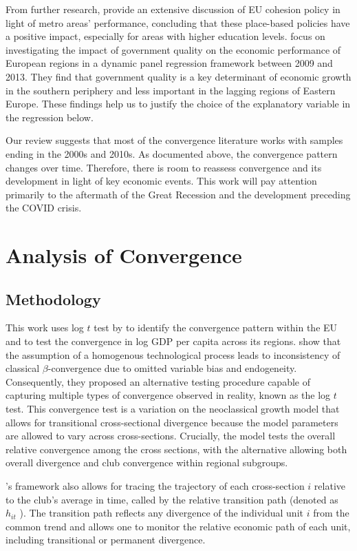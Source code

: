 \documentclass[11pt]{article}
\begin{document}
From further research, \citet{ehrlich2020place} provide an extensive discussion of EU cohesion policy in light of metro areas' performance, concluding that these place-based policies have a positive impact, especially for areas with higher education levels. \citet{rodriguez2020institutional} focus on investigating the impact of government quality on the economic performance of European regions in a dynamic panel regression framework between 2009 and 2013. They find that government quality is a key determinant of economic growth in the southern periphery and less important in the lagging regions of Eastern Europe. These findings help us to justify the choice of the explanatory variable in the regression below.

Our review suggests that most of the convergence literature works with samples ending in the 2000s and 2010s. As documented above, the convergence pattern changes over time. Therefore, there is room to reassess convergence and its development in light of key economic events. This work will pay attention primarily to the aftermath of the Great Recession and the development preceding the COVID crisis.

\section{Analysis of Convergence}
\subsection{Methodology}

This work uses log $t$ test by \citet{phillips2007transition}  to identify the convergence pattern within the EU and to test the convergence in log GDP per capita across its regions. \citet{phillips2007transition} show that the assumption of a homogenous technological process leads to inconsistency of classical $\beta$-convergence due to omitted variable bias and endogeneity. Consequently, they proposed an alternative testing procedure capable of capturing multiple types of convergence observed in reality, known as the log $t$ test. This convergence test is a variation on the neoclassical growth model that allows for transitional cross-sectional divergence because the model parameters are allowed to vary across cross-sections. Crucially, the model tests the overall relative convergence among the cross sections, with the alternative allowing both overall divergence and club convergence within regional subgroups. 

\citeauthor{phillips2009economic}'s framework also allows for tracing the trajectory of each cross-section $i$ relative to the club's average in time, called by \citet{phillips2009economic} the relative transition path (denoted as $h_{it}$ ). The transition path reflects any divergence of the individual unit $i$ from the common trend and allows one to monitor the relative economic path of each unit, including transitional or permanent divergence.
\end{document}
